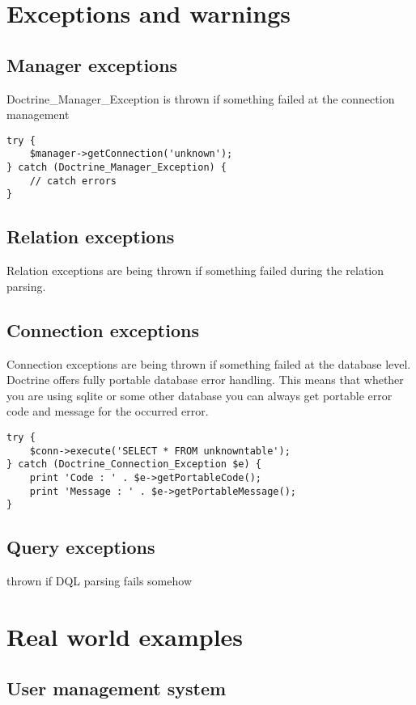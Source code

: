 \documentclass[11pt,a4paper]{report}
\begin{document}
\chapter{Exceptions and warnings}
\section{Manager exceptions}
Doctrine\_Manager\_Exception is thrown if something failed at the connection management

\begin{verbatim}
try {
    $manager->getConnection('unknown');
} catch (Doctrine_Manager_Exception) {
    // catch errors
}
\end{verbatim}

\section{Relation exceptions}
Relation exceptions are being thrown if something failed during the relation parsing.

\section{Connection exceptions}
Connection exceptions are being thrown if something failed at the database level. Doctrine offers fully portable database error handling. This means that whether you are using sqlite or some other database you can always get portable error code and message for the occurred error.

\begin{verbatim}
try {
    $conn->execute('SELECT * FROM unknowntable');
} catch (Doctrine_Connection_Exception $e) {
    print 'Code : ' . $e->getPortableCode();
    print 'Message : ' . $e->getPortableMessage();
}
\end{verbatim}

\section{Query exceptions}
thrown if DQL parsing fails somehow

\chapter{Real world examples}
\section{User management system}
\end{document}
